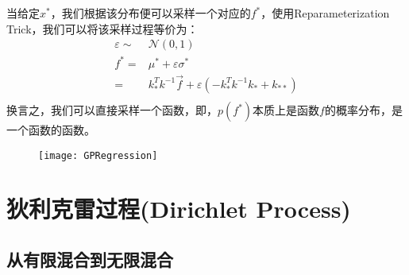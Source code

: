 当给定$x^*$，我们根据该分布便可以采样一个对应的$f^*$，使用Reparameterization Trick，我们可以将该采样过程等价为：
\begin{displaymath}
\begin{split}
\varepsilon \sim & \mathcal{N}(0, 1)\\
f^* = & \mu^* + \varepsilon \sigma^* \\
 =&  k_*^T k^{-1} \vec{f} + \varepsilon ( -k_*^Tk^{-1}k_* + k_{**})\\
\end{split}
\end{displaymath}
换言之，我们可以直接采样一个函数，即，$p(f^*)$本质上是函数$f$的概率分布，是一个函数的函数。

\begin{figure}[htbp]
\centering
\texttt{[image: GPRegression]}
\end{figure}

\section{狄利克雷过程(Dirichlet Process)}


\subsection{从有限混合到无限混合}

